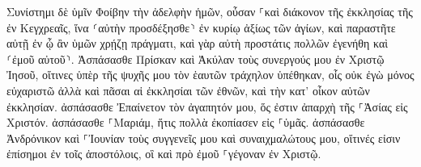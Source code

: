 \documentclass{openreader}
\begin{document}
Συνίστημι δὲ ὑμῖν Φοίβην τὴν ἀδελφὴν ἡμῶν, οὖσαν ⸀καὶ διάκονον τῆς ἐκκλησίας τῆς ἐν Κεγχρεαῖς, 
ἵνα ⸂αὐτὴν προσδέξησθε⸃ ἐν κυρίῳ ἀξίως τῶν ἁγίων, καὶ παραστῆτε αὐτῇ ἐν ᾧ ἂν ὑμῶν χρῄζῃ πράγματι, καὶ γὰρ αὐτὴ προστάτις πολλῶν ἐγενήθη καὶ ⸂ἐμοῦ αὐτοῦ⸃. 
Ἀσπάσασθε Πρίσκαν καὶ Ἀκύλαν τοὺς συνεργούς μου ἐν Χριστῷ Ἰησοῦ, 
οἵτινες ὑπὲρ τῆς ψυχῆς μου τὸν ἑαυτῶν τράχηλον ὑπέθηκαν, οἷς οὐκ ἐγὼ μόνος εὐχαριστῶ ἀλλὰ καὶ πᾶσαι αἱ ἐκκλησίαι τῶν ἐθνῶν, 
καὶ τὴν κατ’ οἶκον αὐτῶν ἐκκλησίαν. ἀσπάσασθε Ἐπαίνετον τὸν ἀγαπητόν μου, ὅς ἐστιν ἀπαρχὴ τῆς ⸀Ἀσίας εἰς Χριστόν. 
ἀσπάσασθε ⸀Μαριάμ, ἥτις πολλὰ ἐκοπίασεν εἰς ⸀ὑμᾶς. 
ἀσπάσασθε Ἀνδρόνικον καὶ ⸀Ἰουνίαν τοὺς συγγενεῖς μου καὶ συναιχμαλώτους μου, οἵτινές εἰσιν ἐπίσημοι ἐν τοῖς ἀποστόλοις, οἳ καὶ πρὸ ἐμοῦ ⸀γέγοναν ἐν Χριστῷ. 
\end{document}
